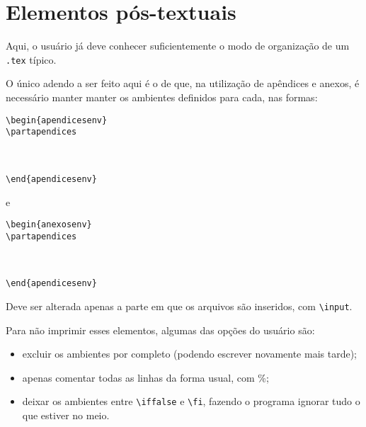 \section{Elementos pós-textuais}
Aqui, o usuário já deve conhecer suficientemente o modo de organização de um \texttt{.tex} típico.

O único adendo a ser feito aqui é o de que, na utilização de apêndices e anexos, é necessário manter manter os ambientes definidos para cada, nas formas:

\begin{verbatim}
\begin{apendicesenv}
\partapendices
    
    
    
\end{apendicesenv}
\end{verbatim}

e

\begin{verbatim}
\begin{anexosenv}
\partapendices
    
    
    
\end{apendicesenv}
\end{verbatim}

Deve ser alterada apenas a parte em que os arquivos são inseridos, com \texttt{\textbackslash input}.

Para não imprimir esses elementos, algumas das opções do usuário são:

\begin{itemize}
    \item excluir os ambientes por completo (podendo escrever novamente mais tarde);
    \item apenas comentar todas as linhas da forma usual, com \%;
    \item deixar os ambientes entre \texttt{\textbackslash iffalse} e \texttt{\textbackslash fi}, fazendo o programa ignorar tudo o que estiver no meio.
\end{itemize}
